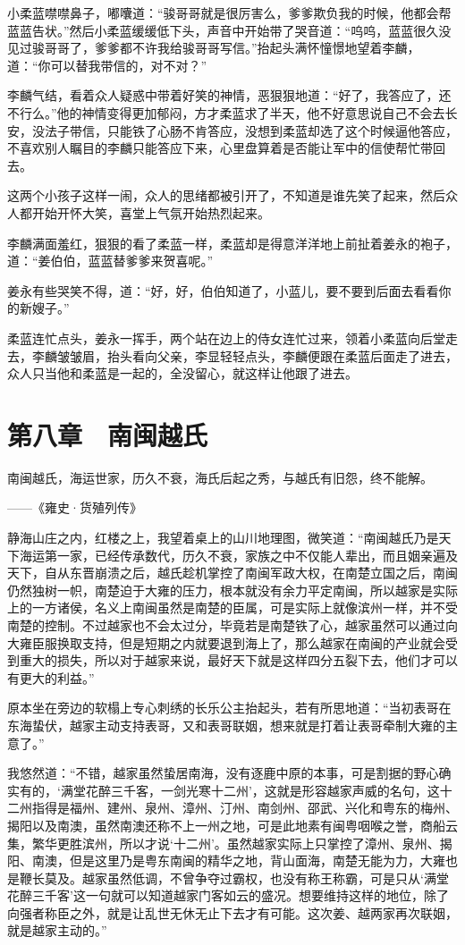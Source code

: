 小柔蓝噤噤鼻子，嘟囔道：“骏哥哥就是很厉害么，爹爹欺负我的时候，他都会帮蓝蓝告状。”然后小柔蓝缓缓低下头，声音中开始带了哭音道：“呜呜，蓝蓝很久没见过骏哥哥了，爹爹都不许我给骏哥哥写信。”抬起头满怀憧憬地望着李麟，道：“你可以替我带信的，对不对？”

李麟气结，看着众人疑惑中带着好笑的神情，恶狠狠地道：“好了，我答应了，还不行么。”他的神情变得更加郁闷，方才柔蓝求了半天，他不好意思说自己不会去长安，没法子带信，只能铁了心肠不肯答应，没想到柔蓝却选了这个时候逼他答应，不喜欢别人瞩目的李麟只能答应下来，心里盘算着是否能让军中的信使帮忙带回去。

这两个小孩子这样一闹，众人的思绪都被引开了，不知道是谁先笑了起来，然后众人都开始开怀大笑，喜堂上气氛开始热烈起来。

李麟满面羞红，狠狠的看了柔蓝一样，柔蓝却是得意洋洋地上前扯着姜永的袍子，道：“姜伯伯，蓝蓝替爹爹来贺喜呢。”

姜永有些哭笑不得，道：“好，好，伯伯知道了，小蓝儿，要不要到后面去看看你的新嫂子。”

柔蓝连忙点头，姜永一挥手，两个站在边上的侍女连忙过来，领着小柔蓝向后堂走去，李麟皱皱眉，抬头看向父亲，李显轻轻点头，李麟便跟在柔蓝后面走了进去，众人只当他和柔蓝是一起的，全没留心，就这样让他跟了进去。

\chapter{第八章　南闽越氏}

南闽越氏，海运世家，历久不衰，海氏后起之秀，与越氏有旧怨，终不能解。

——《雍史·货殖列传》

静海山庄之内，红楼之上，我望着桌上的山川地理图，微笑道：“南闽越氏乃是天下海运第一家，已经传承数代，历久不衰，家族之中不仅能人辈出，而且姻亲遍及天下，自从东晋崩溃之后，越氏趁机掌控了南闽军政大权，在南楚立国之后，南闽仍然独树一帜，南楚迫于大雍的压力，根本就没有余力平定南闽，所以越家是实际上的一方诸侯，名义上南闽虽然是南楚的臣属，可是实际上就像滨州一样，并不受南楚的控制。不过越家也不会太过分，毕竟若是南楚铁了心，越家虽然可以通过向大雍臣服换取支持，但是短期之内就要退到海上了，那么越家在南闽的产业就会受到重大的损失，所以对于越家来说，最好天下就是这样四分五裂下去，他们才可以有更大的利益。”

原本坐在旁边的软榻上专心刺绣的长乐公主抬起头，若有所思地道：“当初表哥在东海蛰伏，越家主动支持表哥，又和表哥联姻，想来就是打着让表哥牵制大雍的主意了。”

我悠然道：“不错，越家虽然蛰居南海，没有逐鹿中原的本事，可是割据的野心确实有的，‘满堂花醉三千客，一剑光寒十二州’，这就是形容越家声威的名句，这十二州指得是福州、建州、泉州、漳州、汀州、南剑州、邵武、兴化和粤东的梅州、揭阳以及南澳，虽然南澳还称不上一州之地，可是此地素有闽粤咽喉之誉，商船云集，繁华更胜滨州，所以才说‘十二州’。虽然越家实际上只掌控了漳州、泉州、揭阳、南澳，但是这里乃是粤东南闽的精华之地，背山面海，南楚无能为力，大雍也是鞭长莫及。越家虽然低调，不曾争夺过霸权，也没有称王称霸，可是只从‘满堂花醉三千客’这一句就可以知道越家门客如云的盛况。想要维持这样的地位，除了向强者称臣之外，就是让乱世无休无止下去才有可能。这次姜、越两家再次联姻，就是越家主动的。”

